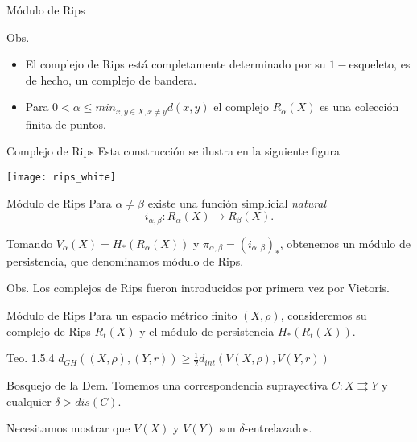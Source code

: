 \documentclass{beamer}
\begin{document}
\begin{frame}{Módulo de Rips}
    \begin{block}{Obs.}
        \begin{itemize}
            \item El complejo de Rips está completamente determinado por su $1-$esqueleto, es de hecho, un complejo de bandera.

            \pause
            \item Para $0<\alpha\leq min_{x, y\in X, x\neq y}d(x, y)$ el complejo $R_{\alpha}(X)$ es una colección finita de puntos.
        \end{itemize}
        
    \end{block}
\end{frame}

\begin{frame}{Complejo de Rips}
    Esta construcción se ilustra en la siguiente figura 
    
    \texttt{[image: rips\_white]}
    
\end{frame}

\begin{frame}{Módulo de Rips}
    Para $\alpha \neq \beta$ existe una función  simplicial \textit{natural}
    $$i_{\alpha, \beta}: R_{\alpha}(X) \to R_{\beta}(X).$$ 
    \pause
    
    Tomando $V_{\alpha}(X) = H_{\ast}(R_{\alpha}(X))$ y $\pi_{\alpha,\beta} = (i_{\alpha,\beta})_{\ast}$, obtenemos un módulo de persistencia, que denominamos módulo de Rips.
    \pause
    
    \begin{block}{Obs.}
        Los complejos de Rips fueron introducidos por primera vez por Vietoris.
    \end{block}

\end{frame}

\begin{frame}{Módulo de Rips}
    Para un espacio métrico finito $(X, \rho)$, consideremos su complejo de Rips $R_{t}(X)$ y el módulo de persistencia $H_{\ast}(R_{t}(X))$.
    \pause

    \begin{block}{Teo. 1.5.4}
        $d_{GH}((X, \rho), (Y, r)) \geq \frac{1}{2} d_{int}(V(X, \rho), V(Y, r))$
    \end{block}
    \pause

    \begin{block}{Bosquejo de la Dem.}
        Tomemos una correspondencia suprayectiva $C: X \rightrightarrows Y$ y cualquier $\delta > dis(C)$.
        \pause

        Necesitamos mostrar que $V(X)$ y $V(Y)$ son $\delta$-entrelazados.
    \end{block}
\end{frame}
\end{document}
